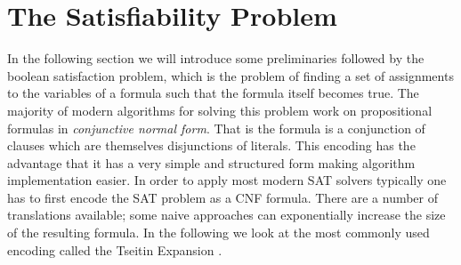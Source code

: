 \section{The Satisfiability Problem}
In the following section we will introduce some preliminaries followed by the boolean satisfaction problem, which is the problem of finding a set of assignments to the variables of a formula such that the formula itself becomes true. The majority of modern algorithms for solving this problem work on propositional formulas in \emph{conjunctive normal form}. That is the formula is a conjunction of clauses which are themselves disjunctions of literals. This encoding has the advantage that it has a very simple and structured form making algorithm implementation easier. In order to apply most modern SAT solvers typically one has to first encode the SAT problem as a CNF formula. There are a number of translations available; some naive approaches can exponentially increase the size of the resulting formula. In the following we look at the most commonly used encoding called the Tseitin Expansion \cite{GT83}.
\medskip
